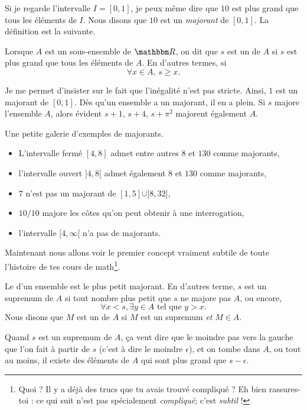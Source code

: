   Si je regarde l'intervalle $I=[0,1]$, je peux même dire que $10$ est plus grand que tous les éléments de $I$. Nous disons que $10$ est un \emph{majorant} de $[0,1]$. La définition est la suivante.
\begin{definition}
Lorsque $A$ est un sous-ensemble de $\eR$, on dit que $s$ est un  de $A$ si $s$ est plus grand que tous les éléments de $A$. En d'autres termes, si
\[
  \forall x\in A,\,s\geq x.
\]
\end{definition}
Je me permet d'insister sur le fait que l'inégalité n'est pas stricte. Ainsi, $1$ est un majorant de $[0,1]$. Dès qu'un ensemble a un majorant, il en a plein. Si $s$ majore l'ensemble $A$, alors évident $s+1$, $s+4$, $s+\pi^2$ majorent également $A$.
\begin{exemple}
Une petite galerie d'exemples de majorants.
\begin{itemize}
\item L'intervalle fermé $[4,8]$ admet entre autres $8$ et $130$ comme majorants,
\item l'intervalle ouvert $]4,8[$ admet également $8$ et $130$ comme majorants,
\item $7$ n'est pas un majorant de $[1,5]\cup]8,32]$,
\item $10/10$ majore les côtes qu'on peut obtenir à une interrogation,
\item l'intervalle $[4,\infty[$ n'a pas de majorants.
\end{itemize}
\end{exemple}
Maintenant nous allons voir le premier concept vraiment subtile de toute l'histoire de tes cours de math\footnote{Quoi ? Il y a déjà des trucs que tu avais trouvé compliqué ? Eh bien rassures-toi : ce qui suit n'est pas spécialement \emph{compliqué}; c'est \emph{subtil} !}.
\begin{definition}
Le  d'un ensemble est le plus petit majorant. En d'autres terme, $s$ est un supremum de $A$ si tout nombre plus petit que $s$ ne majore pas $A$, ou encore,
\[
  \forall x<s,\exists y\in A\text{ tel que } y>x.
\]
Nous disons que $M$ est un  de $A$ si $M$ est un supremum \emph{et} $M\in A$.
\end{definition}
Quand $s$ est un supremum de $A$, ça veut dire que le moindre pas vers la gauche que l'on fait à partir de $s$ (c'est à dire le moindre $\epsilon$), et on tombe dans $A$, ou tout au moins, il existe des éléments de $A$ qui sont plus grand que $s-\epsilon$.

